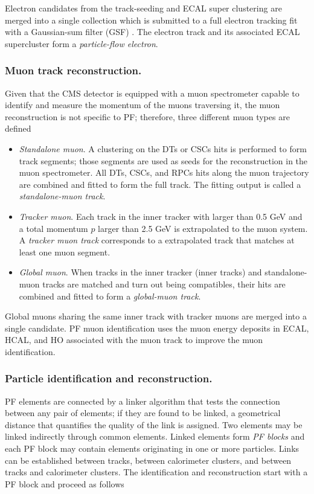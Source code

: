 \noindent Electron candidates from the track-seeding and ECAL super clustering are merged into a single collection which is submitted to a full electron tracking fit with a Gaussian-sum filter (GSF) \cite{gsf}. The electron track and its associated ECAL supercluster form a \textit{particle-flow electron}.

\subsubsection*{Muon track reconstruction.}

\noindent Given that the CMS detector is equipped with a muon spectrometer capable to identify and measure the momentum of the muons traversing it, the muon reconstruction is not specific to PF; therefore, three different muon types are defined

\begin{itemize}
\item \textit{Standalone muon}. A clustering on the DTs or CSCs hits is performed to form track segments; those segments are used as seeds for the reconstruction in the muon spectrometer. All DTs, CSCs, and RPCs hits along the muon trajectory are combined and fitted to form the full track. The fitting output is called a \textit{standalone-muon track}.
\item \textit{Tracker muon}. Each track in the inner tracker with \pt larger than 0.5 GeV and a total momentum $p$ larger than 2.5 GeV is extrapolated to the muon system. A \textit{tracker muon track} corresponds to a extrapolated track that matches at least one muon segment.
\item \textit{Global muon}. When tracks in the inner tracker (inner tracks) and standalone-muon tracks are matched and turn out being compatibles, their hits are combined and fitted to form a \textit{global-muon track}. 
\end{itemize}

\noindent Global muons sharing the same inner track with tracker muons are merged into a single candidate. PF muon identification uses the muon energy deposits in ECAL, HCAL, and HO associated with the muon track to improve the muon identification.

\subsubsection*{Particle identification and reconstruction.}

\noindent PF elements are connected by a linker algorithm that tests the connection between any pair of elements; if they are found to be linked, a geometrical distance that quantifies the quality of the link is assigned. Two elements may be linked indirectly through common elements. Linked elements form \textit{PF blocks} and each PF block may contain elements originating in one or more particles. Links can be established between tracks, between calorimeter clusters, and between tracks and calorimeter clusters. The identification and reconstruction start with a PF block and proceed as follows     

